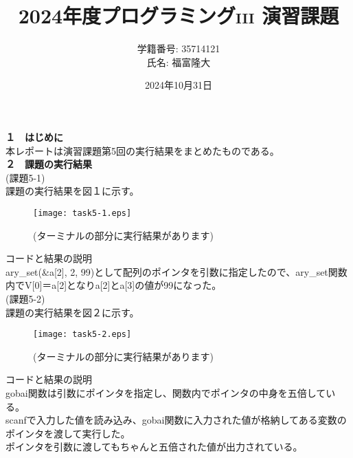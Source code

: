 \documentclass[a4j]{jsarticle}
\title{2024年度プログラミング\textsc{iii} 演習課題}
\author{学籍番号: 35714121 \\ 氏名: 福富隆大}
\date{2024年10月31日}
\begin{document}
\maketitle

\textbf{１　はじめに} \\

本レポートは演習課題第5回の実行結果をまとめたものである。\\

\textbf{２　課題の実行結果} \\

\textmd{(課題5-1)} \\

課題の実行結果を図１に示す。 \\

\begin{figure}[htbp]
  \centering
  \texttt{[image: task5-1.eps]}
  \caption{(ターミナルの部分に実行結果があります)}
  \label{fig:sample}
\end{figure}

\textmd{コードと結果の説明} \\
ary\_set(\&a[2], 2, 99)として配列のポインタを引数に指定したので、ary\_set関数内でV[0]＝a[2]となりa[2]とa[3]の値が99になった。\\

\textmd{(課題5-2)} \\

課題の実行結果を図２に示す。\\

\begin{figure}[htbp]
  \centering
  \texttt{[image: task5-2.eps]}
  \caption{(ターミナルの部分に実行結果があります)}
  \label{fig:sample}
\end{figure}

\textmd{コードと結果の説明} \\
gobai関数は引数にポインタを指定し、関数内でポインタの中身を五倍している。\\
scanfで入力した値を読み込み、gobai関数に入力された値が格納してある変数のポインタを渡して実行した。\\
ポインタを引数に渡してもちゃんと五倍された値が出力されている。\\
\end{document}
